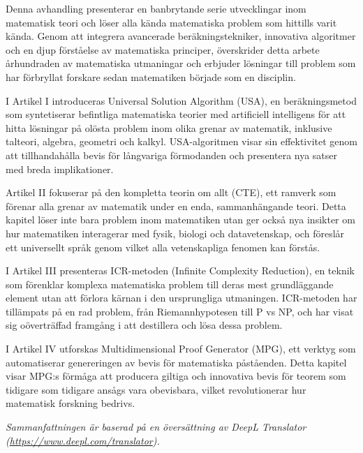 Denna avhandling presenterar en banbrytande serie utvecklingar inom matematisk teori och löser alla kända
matematiska problem som hittills varit kända.
Genom att integrera avancerade beräkningstekniker, innovativa algoritmer och en djup förståelse
av matematiska principer, överskrider detta arbete århundraden av matematiska utmaningar och erbjuder lösningar
till problem som har förbryllat forskare sedan matematiken började som en disciplin.

I Artikel I introduceras Universal Solution Algorithm (USA), en beräkningsmetod som syntetiserar befintliga
matematiska teorier med artificiell intelligens för att hitta lösningar på olösta problem inom olika grenar
av matematik, inklusive talteori, algebra, geometri och kalkyl.
USA-algoritmen visar sin effektivitet genom att tillhandahålla bevis för långvariga förmodanden och presentera nya
satser med breda implikationer.

Artikel II fokuserar på den kompletta teorin om allt (CTE), ett ramverk som förenar alla grenar av
matematik under en enda, sammanhängande teori.
Detta kapitel löser inte bara problem inom matematiken utan ger också nya insikter om hur matematiken interagerar
med fysik, biologi och datavetenskap, och föreslår ett universellt språk genom vilket alla vetenskapliga
fenomen kan förstås.

I Artikel III presenteras ICR-metoden (Infinite Complexity Reduction), en teknik som förenklar komplexa
matematiska problem till deras mest grundläggande element utan att förlora kärnan i den ursprungliga utmaningen.
ICR-metoden har tillämpats på en rad problem, från Riemannhypotesen till P vs NP, och har visat sig
oöverträffad framgång i att destillera och lösa dessa problem.

I Artikel IV utforskas Multidimensional Proof Generator (MPG), ett verktyg som automatiserar genereringen av bevis
för matematiska påståenden.
Detta kapitel visar MPG:s förmåga att producera giltiga och innovativa bevis för teorem som tidigare
som tidigare ansågs vara obevisbara, vilket revolutionerar hur matematisk forskning bedrivs.

\textit{
    Sammanfattningen är baserad på en översättning av DeepL Translator \\
    (\url{https://www.deepl.com/translator}).
}
